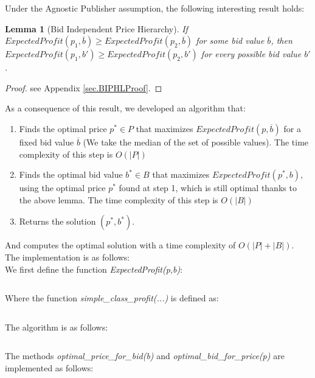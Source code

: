 \documentclass[11pt]{article} %
\newtheorem*{lemma}{Lemma}
\begin{document}
Under the Agnostic Publisher assumption, the following interesting result holds:

\begin{lemma}[Bid Independent Price Hierarchy]
If $ExpectedProfit(p_1,\overline b) \ge ExpectedProfit(p_2,\overline b)$ for some bid value $\overline b$,  then $ExpectedProfit(p_1, b') \ge ExpectedProfit(p_2, b')$  for every possible bid value $b'$.
\end{lemma}
\begin{proof}
see Appendix \ref{sec.BIPHLProof}.
\end{proof}

As a consequence of this result, we developed an algorithm that:
\begin{enumerate}
\item Finds the optimal price $p^*\in P$ that maximizes $ExpectedProfit(p,\overline b)$ for a fixed bid value $\overline b$ (We take the median of the set of possible values). The time complexity of this step is $O(|P|)$
\item Finds the optimal bid value $b^* \in B$ that maximizes $ExpectedProfit(p^*, b)$, using the optimal price $p^*$ found at step 1, which is still optimal thanks to the above lemma. The time complexity of this step is $O(|B|)$
\item Returns the solution $(p^*, b^*)$.
\end{enumerate}
And computes the optimal solution with a time complexity of $O(|P|+|B|)$.\\

The implementation is as follows:\\
We first define the function \textit{ExpectedProfit(p,b)}:
\inputminted{python}{code/step1_expected_profit.py}

Where the function \textit{simple\_class\_profit(...)} is defined as:
\inputminted{python}{code/step1_simple_class_profit.py}
\begin{samepage}
The algorithm is as follows:
\inputminted{python}{code/step1.py}
\end{samepage}
The methods \textit{optimal\_price\_for\_bid(b)} and \textit{optimal\_bid\_for\_price(p)} are implemented as follows:
\inputminted{python}{code/step1_support.py}

\clearpage
\end{document}
